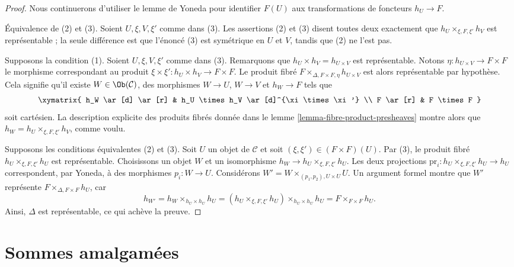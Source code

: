 \begin{proof}
Nous continuerons d'utiliser le lemme de Yoneda pour identifier $F(U)$
aux transformations de foncteurs $h_U \to F$.

\medskip\noindent
Équivalence de (2) et (3). Soient $U, \xi, V, \xi'$ comme dans (3).
Les assertions (2) et (3) disent toutes deux exactement que
$h_U \times_{\xi, F, \xi'} h_V$ est représentable ; la seule différence
est que l'énoncé (3) est symétrique en $U$ et $V$, tandis que (2) ne l'est pas.

\medskip\noindent
Supposons la condition (1). Soient $U, \xi, V, \xi'$
comme dans (3). Remarquons que
$h_U \times h_V = h_{U \times V}$ est représentable.
Notons $\eta : h_{U \times V} \to F \times F$ le morphisme
correspondant au produit $\xi \times \xi' : h_U \times h_V \to F \times F$.
Le produit fibré $F \times_{\Delta, F \times F, \eta} h_{U \times V}$
est alors représentable par hypothèse. Cela signifie qu'il existe
$W \in \Ob(\mathcal{C})$, des morphismes
$W \to U$, $W \to V$ et $h_W \to F$ tels que
$$
\xymatrix{
h_W \ar[d] \ar[r] & h_U \times h_V \ar[d]^{\xi \times \xi'} \\
F \ar[r] & F \times F
}
$$
soit cartésien. La description explicite des produits fibrés donnée dans le
lemme \ref{lemma-fibre-product-presheaves} montre alors que
$h_W = h_U \times_{\xi, F, \xi'} h_V$, comme voulu.

\medskip\noindent
Supposons les conditions équivalentes (2) et (3). Soit $U$ un objet
de $\mathcal{C}$ et soit $(\xi, \xi') \in (F \times F)(U)$.
Par (3), le produit fibré $h_U \times_{\xi, F, \xi'} h_U$ est
représentable. Choisissons un objet $W$ et un isomorphisme
$h_W \to h_U \times_{\xi, F, \xi'} h_U$. Les deux projections
$\text{pr}_i : h_U \times_{\xi, F, \xi'} h_U \to h_U$
correspondent, par Yoneda, à des morphismes $p_i : W \to U$.
Considérons
$W' = W \times_{(p_1, p_2), U \times U} U$. Un argument formel montre
que $W'$ représente $F \times_{\Delta, F \times F} h_U$, car
$$
h_{W'} = h_W \times_{h_U \times h_U} h_U
= (h_U \times_{\xi, F, \xi'} h_U) \times_{h_U \times h_U} h_U
= F \times_{F \times F} h_U.
$$
Ainsi, $\Delta$ est représentable, ce qui achève la preuve.
\end{proof}








\section{Sommes amalgamées}
\label{section-pushouts}

